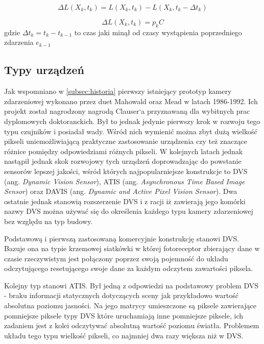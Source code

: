     \begin{equation}
    \label{eq:1}
        \Delta L(X_k, t_k) =  L(X_k, t_k) -  L(X_k, t_k- \Delta t_k)
    \end{equation}
    
    \begin{equation}
    \label{eq:2}
        \Delta L(X_k, t_k) = p_k C
    \end{equation}
gdzie \(\Delta t_k = t_k - t_{k-1}\) to czas jaki minął od czasy wystąpienia poprzedniego zdarzenia \(e_{k-1}\)
    
    \subsection{Typy urządzeń}
    \label{subsec:TypyUrzadzen}
    Jak wspomniano w \ref{subsec:historia} pierwszy istniejący prototyp kamery zdarzeniowej wykonano przez duet Mahowald oraz Mead w latach 1986-1992. Ich projekt został nagrodzony nagrodą Clauser`a przyznawaną dla wybitnych prac dyplomowych doktoranckich. Był to jednak jedynie pierwszy krok w rozwoju tego typu czujników i posiadał wady. Wśród nich wymienić można zbyt dużą wielkość pikseli uniemożliwiającą praktyczne zastosowanie urządzenia czy też znaczące różnice pomiędzy odpowiedziami różnych pikseli. W kolejnych latach jednak nastąpił jednak skok rozwojowy tych urządzeń doprowadzając do powstanie sensorów lepszej jakości, wśród których najpopularniejsze konstrukcje to DVS (ang. \emph{Dynamic Vision Sensor}), ATIS (ang. \emph{Asynchronous Time Based Image Sensor}) oraz DAVIS (ang. \emph{Dynamic and Active Pixel Vision Sensor}). Dwa ostatnie jednak stanowią rozszerzenie DVS i z racji iż zawierają jego komórki nazwy DVS można używać się do określenia każdego typu kamery zdarzeniowej bez względu na typ budowy.\
    
    \indent Podstawową i pierwszą zastosowaną komercyjnie konstrukcję stanowi DVS. Bazuje ona na typie  krzemowej siatkówki w której fotoreceptor zbierający dane w czasie rzeczywistym jest połączony poprzez swoją pojemność do układu odczytującego resetującego swoje dane za każdym odczytem zawartości piksela.\ 
    
    \indent Kolejny typ stanowi ATIS. Był jedną z odpowiedzi na podstawowy problem DVS - braku informacji statycznych dotyczących sceny jak przykładowo wartość absolutna poziomu jasności. Na jego matrycy umieszczone są piksele zawierające pomniejsze piksele typy DVS które uruchamiają inne pomniejsze piksele, ich zadaniem jest z kolei odczytywać absolutną wartość poziomu światła. Problemem układu tego typu wielkość pikseli, co najmniej dwa razy większa niż w DVS.\
    
